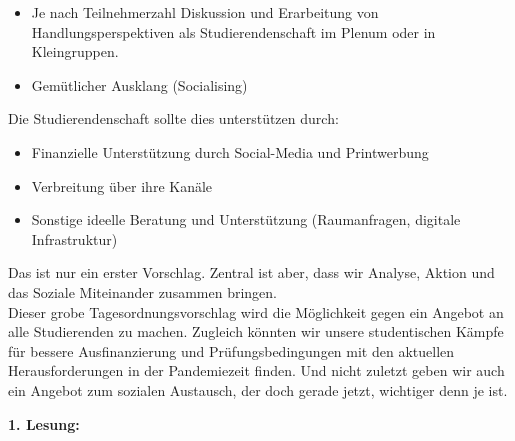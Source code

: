 {\begin{itemize}
            Wissenschaft (zum Beispiel Sozialforschung) oder Schulen und Kindergärten.
        \item Je nach Teilnehmerzahl Diskussion und Erarbeitung von Handlungsperspektiven als
            Studierendenschaft im Plenum oder in Kleingruppen.
        \item Gemütlicher Ausklang (Socialising)
    \end{itemize}
    Die Studierendenschaft sollte dies unterstützen durch:
    \begin{itemize}
        \item Finanzielle Unterstützung durch Social-Media und Printwerbung
        \item Verbreitung über ihre Kanäle
        \item Sonstige ideelle Beratung und Unterstützung (Raumanfragen, digitale Infrastruktur)
    \end{itemize}
    Das ist nur ein erster Vorschlag. Zentral ist aber, dass wir Analyse, Aktion und das Soziale
    Miteinander zusammen bringen.\\
    Dieser grobe Tagesordnungsvorschlag wird die Möglichkeit gegen ein Angebot an alle Studierenden
    zu machen. Zugleich könnten wir unsere studentischen Kämpfe für bessere Ausfinanzierung und
    Prüfungsbedingungen mit den aktuellen Herausforderungen in der Pandemiezeit finden. Und nicht
    zuletzt geben wir auch ein Angebot zum sozialen Austausch, der doch gerade jetzt, wichtiger denn je ist.
}{\textbf{1. Lesung:}
    \ul{
            \ul{}
            \ul{
                }
            \ul{}
            \ul{}
}}

